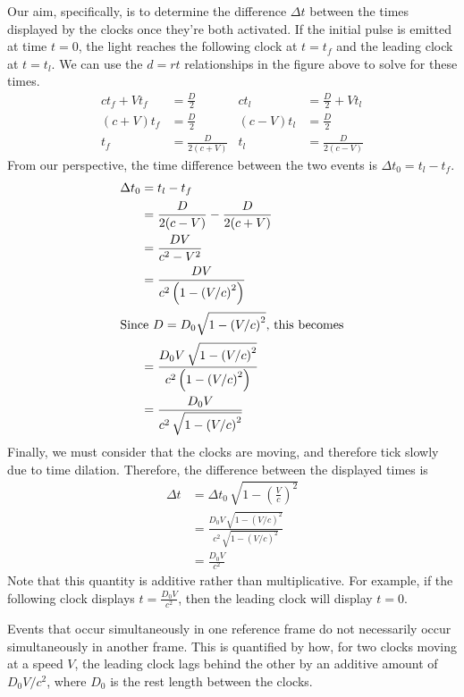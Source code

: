 \documentclass[../p023main.tex]{subfiles}
\begin{document}
Our aim, specifically, is to determine the difference $\Delta t$ between the times displayed by the clocks once they're both activated.
If the initial pulse is emitted at time $t = 0$, the light reaches the following clock at $t = t_f$ and the leading clock at $t = t_l$.
We can use the $d = rt$ relationships in the figure above to solve for these times.
\begin{align*}
    ct_f + Vt_f &= \frac{D}{2} & ct_l &= \frac{D}{2} + Vt_l \\
    (c + V)t_f &= \frac{D}{2} & (c - V)t_l &= \frac{D}{2} \\
    t_f &= \frac{D}{2(c + V)} & t_l &= \frac{D}{2(c - V)}
\end{align*}
From our perspective, the time difference between the two events is $\Delta t_0 = t_l - t_f$.
\begin{align*}
    \Delta t_0 &= t_l - t_f \\
    &= \frac{D}{2 (c - V)} - \frac{D}{2 (c + V)} \\
    &= \frac{DV}{c^2 - V^2} \\
    &= \frac{DV}{c^2 \left( 1 - \left( V / c \right)^2  \right)} \\
    \intertext{Since $D = D_0\sqrt{1 - \left( V / c \right)^2}$, this becomes}
    &= \frac{D_0 V \, \sqrt{ 1 - \left( V / c \right)^2 }}{c^2 \left( 1 - \left( V / c \right)^2  \right)} \\
    &= \frac{D_0 V}{c^2 \,\sqrt{ 1 - \left( V / c \right)^2 }}
\end{align*}
Finally, we must consider that the clocks are moving, and therefore tick slowly due to time dilation.
Therefore, the difference between the displayed times is
\begin{align}
    \Delta t &= \Delta t_0 \, \sqrt{ 1 - \left( \frac{V}{c} \right)^2} \\
    &= \frac{D_0 V \, \sqrt{ 1 - \left( V / c \right)^2}}{c^2 \, \sqrt{ 1 - \left( V / c \right)^2}} \\
    &= \frac{D_0 V}{c^2}
\end{align}
Note that this quantity is additive rather than multiplicative.
For example, if the following clock displays $t = \frac{D_0V}{c^2}$, then the leading clock will display $t = 0$.

\begin{summary}
    Events that occur simultaneously in one reference frame do not necessarily occur simultaneously in another frame.
    This is quantified by how, for two clocks moving at a speed $V$, the leading clock lags behind the other by an additive amount of $D_0V / c^2$, where $D_0$ is the rest length between the clocks.
\end{summary}
\end{document}

